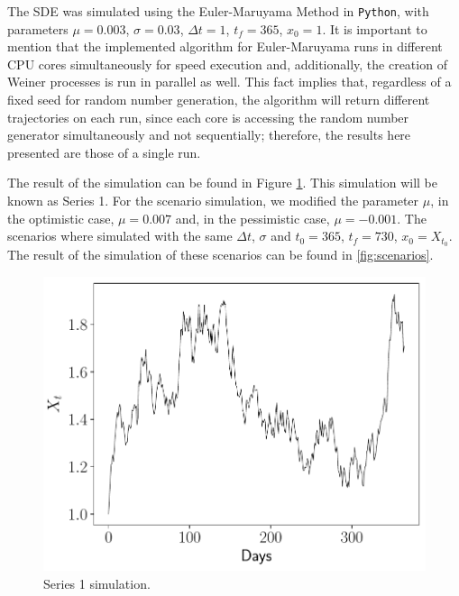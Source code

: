 \documentclass[11pt]{article}
\theoremstyle{definition}
\theoremstyle{remark}
\theoremstyle{remark}
\begin{document}
The SDE was simulated using the Euler-Maruyama Method
\parencite{higham2001} in \texttt{Python}, with parameters $\mu = 0.003$,
$\sigma = 0.03$, $\Delta t = 1$, $t_f = 365$, $x_0 = 1$. It is important to
mention that the implemented algorithm for Euler-Maruyama runs in different
CPU cores simultaneously for speed execution and, additionally, the creation of
Weiner processes is run in parallel as well. This fact implies that, regardless
of a fixed seed for random number generation, the algorithm will return
different trajectories on each run, since each core is accessing the random
number generator simultaneously and not sequentially; therefore, the results
here presented are those of a single run.

The result of the simulation can be found in Figure \ref{fig:series1}. This
simulation will be known as Series 1. For the scenario simulation, we
modified the parameter $\mu$, in the
optimistic case, $\mu=0.007$ and, in the pessimistic case,
$\mu=-0.001$. The scenarios where simulated with the same $\Delta t$,
$\sigma$ and $t_0 = 365$, $t_f = 730$, $x_0=X_{t_0}$. The result of
the simulation of these scenarios can be found in \ref{fig:scenarios}.

\begin{figure}[H]
  \centering
  \includegraphics[scale=0.5]{series1.pdf}
  \caption{Series 1 simulation.}
  \label{fig:series1}
\end{figure}
\end{document}
